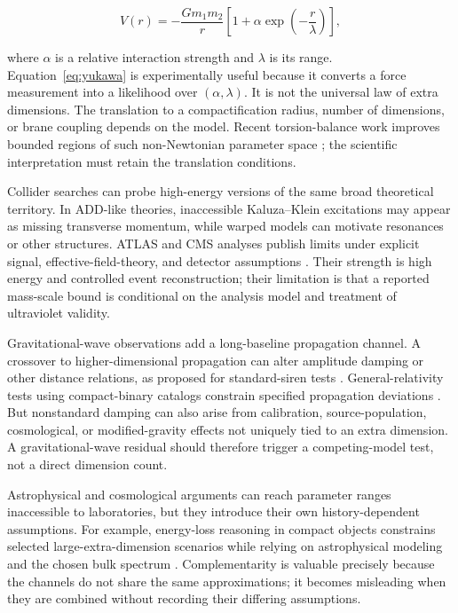 \documentclass[conference]{IEEEtran}
\begin{document}
\begin{equation}
V(r)=-\frac{Gm_1m_2}{r}\left[1+\alpha\exp\left(-\frac{r}{\lambda}\right)\right],
\label{eq:yukawa}
\end{equation}

where $\alpha$ is a relative interaction strength and $\lambda$ is its range. Equation~\eqref{eq:yukawa} is experimentally useful because it converts a force measurement into a likelihood over $(\alpha,\lambda)$. It is not the universal law of extra dimensions. The translation to a compactification radius, number of dimensions, or brane coupling depends on the model. Recent torsion-balance work improves bounded regions of such non-Newtonian parameter space \cite{lee2020}; the scientific interpretation must retain the translation conditions.

Collider searches can probe high-energy versions of the same broad theoretical territory. In ADD-like theories, inaccessible Kaluza--Klein excitations may appear as missing transverse momentum, while warped models can motivate resonances or other structures. ATLAS and CMS analyses publish limits under explicit signal, effective-field-theory, and detector assumptions \cite{atlas2021,cms2019}. Their strength is high energy and controlled event reconstruction; their limitation is that a reported mass-scale bound is conditional on the analysis model and treatment of ultraviolet validity.

Gravitational-wave observations add a long-baseline propagation channel. A crossover to higher-dimensional propagation can alter amplitude damping or other distance relations, as proposed for standard-siren tests \cite{deffayet2007}. General-relativity tests using compact-binary catalogs constrain specified propagation deviations \cite{abbott2019}. But nonstandard damping can also arise from calibration, source-population, cosmological, or modified-gravity effects not uniquely tied to an extra dimension. A gravitational-wave residual should therefore trigger a competing-model test, not a direct dimension count.

Astrophysical and cosmological arguments can reach parameter ranges inaccessible to laboratories, but they introduce their own history-dependent assumptions. For example, energy-loss reasoning in compact objects constrains selected large-extra-dimension scenarios while relying on astrophysical modeling and the chosen bulk spectrum \cite{hannestad2003}. Complementarity is valuable precisely because the channels do not share the same approximations; it becomes misleading when they are combined without recording their differing assumptions.
\end{document}
